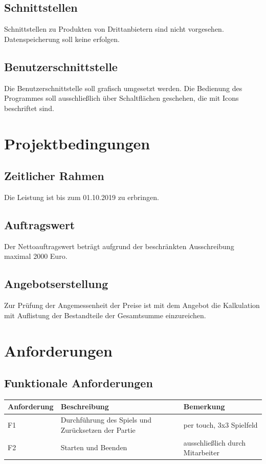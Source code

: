 \documentclass[12pt]{article}
\begin{document}
\subsection{Schnittstellen}
Schnittstellen zu Produkten von Drittanbietern sind nicht vorgesehen. Datenspeicherung soll keine erfolgen.

\subsection{Benutzerschnittstelle}
Die Benutzerschnittstelle soll grafisch umgesetzt werden. Die Bedienung des Programmes soll ausschließlich über Schaltflächen geschehen, die mit \Glspl{Icon} beschriftet sind.

\section{Projektbedingungen}
\subsection{Zeitlicher Rahmen}
Die Leistung ist bis zum 01.10.2019 zu erbringen.

\subsection{Auftragswert}
Der Nettoauftragswert beträgt aufgrund der beschränkten Ausschreibung maximal 2000 Euro.

\subsection{Angebotserstellung}
Zur Prüfung der Angemessenheit der Preise ist mit dem Angebot die Kalkulation mit Auflistung der Bestandteile der Gesamtsumme einzureichen.

\section{Anforderungen}
\subsection{Funktionale Anforderungen}
\begin{tabularx}{\textwidth}{|l|X|X|} \hline
\textbf{Anforderung} & \textbf{Beschreibung} & \textbf{Bemerkung}\\ \hline
F1 & Durchführung des Spiels und Zurücksetzen der Partie & per touch, 3x3 Spielfeld \\ \hline
F2 & Starten und Beenden & ausschließlich durch Mitarbeiter \\ \hline
\end{tabularx}\\
\end{document}
